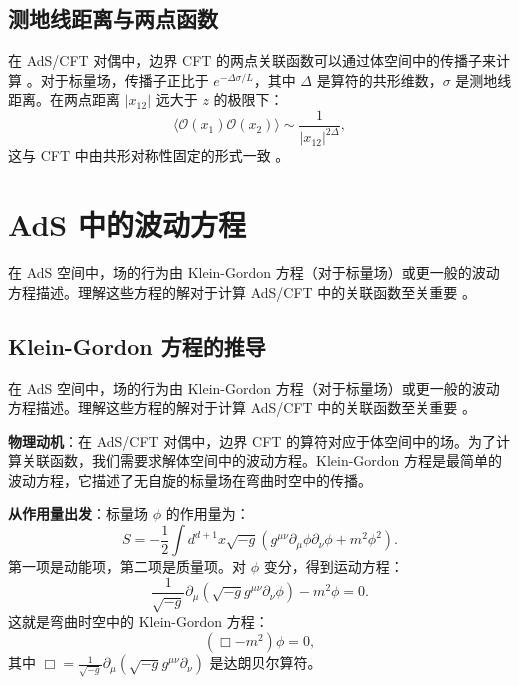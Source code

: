 \subsection{测地线距离与两点函数}

在 AdS/CFT 对偶中，边界 CFT 的两点关联函数可以通过体空间中的传播子来计算 \cite{Witten1998}。对于标量场，传播子正比于 $e^{-\Delta \sigma/L}$，其中 $\Delta$ 是算符的共形维数，$\sigma$ 是测地线距离。在两点距离 $|x_{12}|$ 远大于 $z$ 的极限下：
\begin{equation}
    \langle \mathcal{O}(x_1) \mathcal{O}(x_2) \rangle \sim \frac{1}{|x_{12}|^{2\Delta}},
\end{equation}
这与 CFT 中由共形对称性固定的形式一致 \cite{Maldacena1997}。

\section{AdS 中的波动方程}

在 AdS 空间中，场的行为由 Klein-Gordon 方程（对于标量场）或更一般的波动方程描述。理解这些方程的解对于计算 AdS/CFT 中的关联函数至关重要 \cite{Witten1998}。

\subsection{Klein-Gordon 方程的推导}

在 AdS 空间中，场的行为由 Klein-Gordon 方程（对于标量场）或更一般的波动方程描述。理解这些方程的解对于计算 AdS/CFT 中的关联函数至关重要 \cite{Aharony1999}。

\textbf{物理动机}：在 AdS/CFT 对偶中，边界 CFT 的算符对应于体空间中的场。为了计算关联函数，我们需要求解体空间中的波动方程。Klein-Gordon 方程是最简单的波动方程，它描述了无自旋的标量场在弯曲时空中的传播。

\textbf{从作用量出发}：标量场 $\phi$ 的作用量为：
\begin{equation}
    S = -\frac{1}{2} \int d^{d+1}x \sqrt{-g} \left( g^{\mu\nu} \partial_\mu \phi \partial_\nu \phi + m^2 \phi^2 \right).
\end{equation}
第一项是动能项，第二项是质量项。对 $\phi$ 变分，得到运动方程：
\begin{equation}
    \frac{1}{\sqrt{-g}} \partial_\mu \left( \sqrt{-g} g^{\mu\nu} \partial_\nu \phi \right) - m^2 \phi = 0.
\end{equation}
这就是弯曲时空中的 Klein-Gordon 方程：
\begin{equation}
    (\Box - m^2) \phi = 0,
\end{equation}
其中 $\Box = \frac{1}{\sqrt{-g}} \partial_\mu (\sqrt{-g} g^{\mu\nu} \partial_\nu)$ 是达朗贝尔算符。

